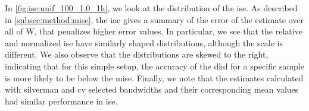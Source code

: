 In \cref{fig:ise:unif_100_1.0_1h}, we look at the distribution of the \gls{ise}.
As described in \cref{subsec:method:mise},
the \gls{iae} gives a summary of the error of the estimate over all of \gls{W},
that penalizes higher error values.
In particular, we see that the relative and normalized \gls{ise} have similarly shaped distributions, although the scale is different.
We also observe that the distributions are skewed to the right,
indicating that for this simple setup,
the accuracy of the \gls{dkd} for a specific sample is more likely to be below the \gls{mise}.
Finally, we note that the estimates calculated with \gls{silverman} and \gls{cv}
selected bandwidths and their corresponding mean values had similar performance in \gls{ise}.


